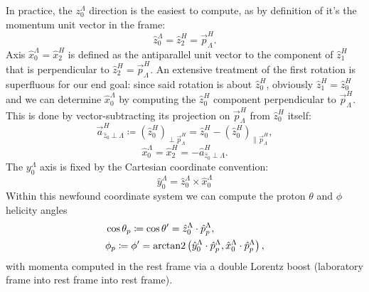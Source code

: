 In practice, the $z_0^\Lambda$ direction is the easiest to compute, as by definition of \slambda it's the \lbz momentum unit vector in the \shad frame:
\begin{equation}
	\hat{z}_0^\Lambda = \hat{z}_2^H = \vec{p}_\Lambda^H.
\end{equation}
%
Axis $\hat{x}_0^\Lambda = \hat{x}_2^H$ is defined as the antiparallel unit vector to the component of $\hat{z}_1^H$ that is perpendicular to $\hat{z}_2^H = \vec{p}_\Lambda^H$.
An extensive treatment of the first rotation is superfluous for our end goal:
since said rotation is about $\hat{z}_0^H$, obviously $\hat{z}_1^H = \hat{z}_0^H$ and we can determine $\hat{x}_0^\Lambda$ by computing the $\hat{z}_0^H$ component perpendicular to
$\vec{p}_\Lambda^H$.
This is done by vector-subtracting its projection on $\vec{p}_\Lambda^H$ from $\hat{z}_0^H$ itself:
\begin{equation}
	\vec{a}^H_{\hat{z}_0 \perp \Lambda}
	\coloneqq
	\left(\hat{z}_0^H\right)_{\perp \vec{p}_\Lambda^H}
	=
	\hat{z}_0^H - \left(\hat{z}_0^H\right)_{\parallel \vec{p}_\Lambda^H},
\end{equation}
\begin{equation}
	\hat{x}_0^\Lambda = \hat{x}_2^H
	=
	- \hat{a}^H_{\hat{z}_0 \perp \Lambda}.
\end{equation}
The $y_0^\Lambda$ axis is fixed by the Cartesian coordinate convention:
\begin{equation}
	\hat{y}_0^\Lambda = \hat{z}_0^\Lambda \times \hat{x}_0^\Lambda
\end{equation}
Within this newfound coordinate system we can compute the proton $\theta$ and $\phi$ helicity angles
\begin{subequations}
	\label{eq:5:helicity_angles}
	\begin{align}
		&\cos\theta_p \coloneqq \cos\theta'
		=
		\hat{z}_0^\Lambda \cdot \hat{p}_p^\Lambda,
		\label{eq:5:helicity_theta} \\
		&\phi_p \coloneqq \phi'
		=
		\operatorname{arctan2}
		\left(
			\hat{y}_0^\Lambda \cdot \hat{p}_p^\Lambda,
			\hat{x}_0^\Lambda \cdot \hat{p}_p^\Lambda
		\right),
		\label{eq:5:helicity_phi}
	\end{align}
\end{subequations}
with momenta computed in the \lz rest frame via a double Lorentz boost (laboratory frame into \lbz rest frame into \lz rest frame).

